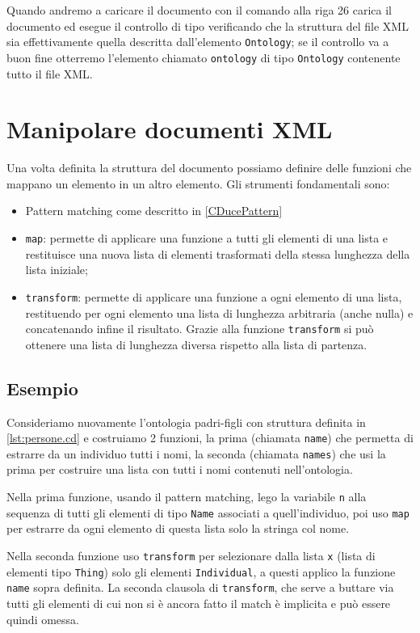Quando andremo a caricare il documento con il comando alla riga 26 \cduce carica il documento ed esegue il controllo di tipo verificando che la struttura del file XML sia effettivamente quella descritta dall'elemento \verb|Ontology|; se il controllo va a buon fine otterremo l'elemento chiamato \verb|ontology| di tipo \verb|Ontology| contenente tutto il file XML.
\section{Manipolare documenti XML}
Una volta definita la struttura del documento possiamo definire delle funzioni che mappano un elemento in un altro elemento. Gli strumenti fondamentali sono:
\begin{itemize}
	\item Pattern matching come descritto in \ref{CDucePattern}
	\item \verb|map|\label{map}: permette di applicare una funzione a tutti gli elementi di una lista e restituisce una nuova lista di elementi trasformati della stessa lunghezza della lista iniziale;
	\item \verb|transform|: permette di applicare una funzione a ogni elemento di una lista, restituendo per ogni elemento una lista di lunghezza arbitraria (anche nulla) e concatenando infine il risultato. Grazie alla funzione \verb|transform| si può ottenere una lista di lunghezza diversa rispetto alla lista di partenza.
\end{itemize}
\subsection{Esempio}
Consideriamo nuovamente l'ontologia padri-figli con struttura definita in \ref{lst:persone.cd} e costruiamo 2 funzioni, la prima (chiamata \verb|name|) che permetta di estrarre da un individuo tutti i nomi, la seconda (chiamata \verb|names|) che usi la prima per costruire una lista con tutti i nomi contenuti nell'ontologia.

Nella prima funzione, usando il pattern matching, lego la variabile \verb|n| alla sequenza di tutti gli elementi di tipo \verb|Name| associati a quell'individuo, poi uso \verb|map| per estrarre da ogni elemento di questa lista solo la stringa col nome.

Nella seconda funzione uso \verb|transform| per selezionare dalla lista \verb|x| (lista di elementi tipo \verb|Thing|) solo gli elementi \verb|Individual|, a questi applico la funzione \verb|name| sopra definita. La seconda clausola di \verb|transform|, che serve a buttare via tutti gli elementi di cui non si è ancora fatto il match è implicita e può essere quindi omessa.

